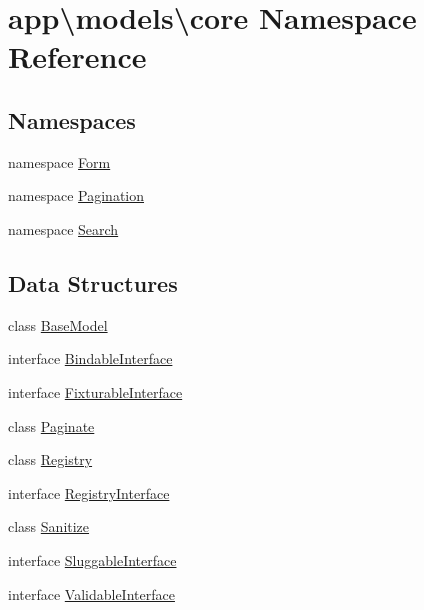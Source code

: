 \hypertarget{namespaceapp_1_1models_1_1core}{\section{app\textbackslash{}models\textbackslash{}core Namespace Reference}
\label{namespaceapp_1_1models_1_1core}
}
\subsection*{Namespaces}
\begin{DoxyCompactItemize}
\item 
namespace \hyperlink{namespaceapp_1_1models_1_1core_1_1_form}{Form}
\item 
namespace \hyperlink{namespaceapp_1_1models_1_1core_1_1_pagination}{Pagination}
\item 
namespace \hyperlink{namespaceapp_1_1models_1_1core_1_1_search}{Search}
\end{DoxyCompactItemize}
\subsection*{Data Structures}
\begin{DoxyCompactItemize}
\item 
class \hyperlink{classapp_1_1models_1_1core_1_1_base_model}{Base\-Model}
\item 
interface \hyperlink{interfaceapp_1_1models_1_1core_1_1_bindable_interface}{Bindable\-Interface}
\item 
interface \hyperlink{interfaceapp_1_1models_1_1core_1_1_fixturable_interface}{Fixturable\-Interface}
\item 
class \hyperlink{classapp_1_1models_1_1core_1_1_paginate}{Paginate}
\item 
class \hyperlink{classapp_1_1models_1_1core_1_1_registry}{Registry}
\item 
interface \hyperlink{interfaceapp_1_1models_1_1core_1_1_registry_interface}{Registry\-Interface}
\item 
class \hyperlink{classapp_1_1models_1_1core_1_1_sanitize}{Sanitize}
\item 
interface \hyperlink{interfaceapp_1_1models_1_1core_1_1_sluggable_interface}{Sluggable\-Interface}
\item 
interface \hyperlink{interfaceapp_1_1models_1_1core_1_1_validable_interface}{Validable\-Interface}
\end{DoxyCompactItemize}
